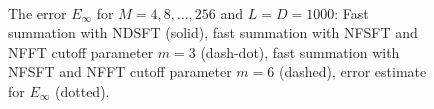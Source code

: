\documentclass[11pt,a4paper,twoside,bibtotoc]{scrartcl}
\theoremstyle{plain}
\theoremstyle{definition}
\theoremstyle{remark}
\numberwithin{equation}{section}
\numberwithin{table}{section}
\numberwithin{figure}{section}
\begin{document}
\begin{figure}[tb]
  \centering
  \hfill
  \\
  \hfill
  \caption{The error $E_{\infty}$ for $M = 4,8,\ldots,256$ and $L = D = 1000$: 
  Fast summation with NDSFT (solid), fast summation with NFSFT and 
  NFFT cutoff parameter $m = 3$ (dash-dot), fast summation with NFSFT and NFFT cutoff 
  parameter $m = 6$ (dashed), error estimate for 
  $E_{\infty}$ (dotted).}
  \label{fig:error}
\end{figure}
\end{document}
